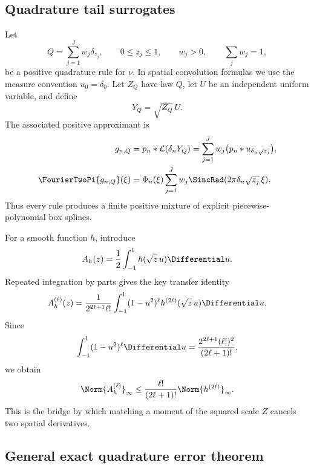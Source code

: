 \documentclass[11pt,oneside]{article}
\numberwithin{equation}{section}
\theoremstyle{definition}
\theoremstyle{remark}
\begin{document}
\subsection{Quadrature tail surrogates}

Let
\begin{equation}
 Q=\sum_{j=1}^{J}w_j\delta_{z_j},
 \qquad
 0\le z_j\le1,
 \qquad w_j>0,
 \qquad \sum_jw_j=1,
 \label{p3:eq:quadrature-Q}
\end{equation}
be a positive quadrature rule for $\nu$.  In spatial convolution formulas we use the
measure convention $u_0=\delta_0$.  Let $Z_Q$ have law $Q$, let $U$ be an
independent uniform variable, and define
\begin{equation}
 Y_Q=\sqrt{Z_Q}\,U.
 \label{p3:eq:YQ}
\end{equation}
The associated positive approximant is
\begin{align}
 g_{n,Q}
 &=p_n*\mathcal L(\delta_nY_Q)
 =\sum_{j=1}^{J}w_j\bigl(p_n*u_{\delta_n\sqrt{z_j}}\bigr),
 \label{p3:eq:gQ-spatial}\\
 \FourierTwoPi{g_{n,Q}}(\xi)
 &=\Phi_n(\xi)\sum_{j=1}^{J}w_j
 \SincRad(2\pi\delta_n\sqrt{z_j}\,\xi).
 \label{p3:eq:gQ-fourier}
\end{align}
Thus every rule produces a finite positive mixture of explicit piecewise-polynomial
box splines.

For a smooth function $h$, introduce
\begin{equation}
 A_h(z)=\frac12\int_{-1}^{1}h(\sqrt z\,u)\Differential u.
 \label{p3:eq:Ah}
\end{equation}
Repeated integration by parts gives the key transfer identity
\begin{equation}
 A_h^{(\ell)}(z)
 =\frac{1}{2^{2\ell+1}\ell!}
 \int_{-1}^{1}(1-u^2)^\ell h^{(2\ell)}(\sqrt z\,u)\Differential u.
 \label{p3:eq:Ah-derivative}
\end{equation}
Since
\begin{equation}
 \int_{-1}^{1}(1-u^2)^\ell\Differential u
 =\frac{2^{2\ell+1}(\ell!)^2}{(2\ell+1)!},
 \label{p3:eq:beta-integral}
\end{equation}
we obtain
\begin{equation}
 \Norm{A_h^{(\ell)}}_\infty
 \le\frac{\ell!}{(2\ell+1)!}\Norm{h^{(2\ell)}}_\infty.
 \label{p3:eq:Ah-bound}
\end{equation}
This is the bridge by which matching a moment of the squared scale $Z$ cancels two
spatial derivatives.

\subsection{General exact quadrature error theorem}
\end{document}
